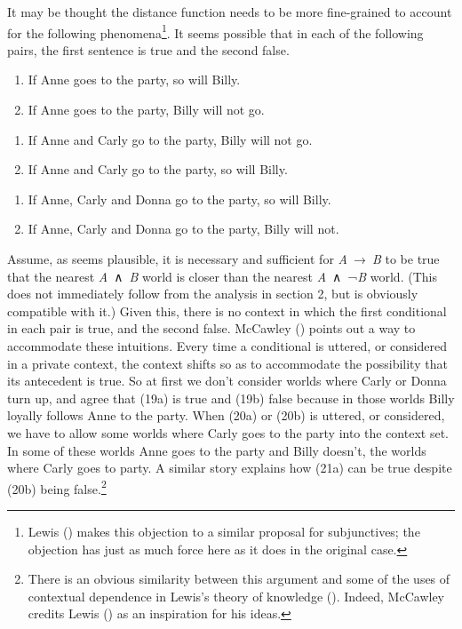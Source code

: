 \documentclass[
  11pt,
  letterpaper,
  DIV=11,
  numbers=noendperiod,
  twoside]{scrartcl}
\providecommand{\tightlist}{%
  \setlength{\itemsep}{0pt}\setlength{\parskip}{0pt}}
\begin{document}
It may be thought the distance function needs to be more fine-grained to
account for the following phenomena\footnote{Lewis
  () makes this objection to a similar
  proposal for subjunctives; the objection has just as much force here
  as it does in the original case.}. It seems possible that in each of
the following pairs, the first sentence is true and the second false.

\begin{description}
\tightlist
\item[(19)]
\hfill
\begin{enumerate}
\def\labelenumi{\alph{enumi}.}
\tightlist
\item
  If Anne goes to the party, so will Billy.
\item
  If Anne goes to the party, Billy will not go.
\end{enumerate}
\item[(20)]
\hfill
\begin{enumerate}
\def\labelenumi{\alph{enumi}.}
\tightlist
\item
  If Anne and Carly go to the party, Billy will not go.
\item
  If Anne and Carly go to the party, so will Billy.
\end{enumerate}
\item[(21)]
\hfill
\begin{enumerate}
\def\labelenumi{\alph{enumi}.}
\tightlist
\item
  If Anne, Carly and Donna go to the party, so will Billy.
\item
  If Anne, Carly and Donna go to the party, Billy will not.
\end{enumerate}
\end{description}

Assume, as seems plausible, it is necessary and sufficient for
\emph{A}~→~\emph{B} to be true that the nearest \emph{A}~∧~\emph{B}
world is closer than the nearest \emph{A}~∧~¬\emph{B} world. (This does
not immediately follow from the analysis in section 2, but is obviously
compatible with it.) Given this, there is no context in which the first
conditional in each pair is true, and the second false. McCawley
() points out a way to accommodate
these intuitions. Every time a conditional is uttered, or considered in
a private context, the context shifts so as to accommodate the
possibility that its antecedent is true. So at first we don't consider
worlds where Carly or Donna turn up, and agree that (19a) is true and
(19b) false because in those worlds Billy loyally follows Anne to the
party. When (20a) or (20b) is uttered, or considered, we have to allow
some worlds where Carly goes to the party into the context set. In some
of these worlds Anne goes to the party and Billy doesn't, the worlds
where Carly goes to party. A similar story explains how (21a) can be
true despite (20b) being false.\footnote{There is an obvious similarity
  between this argument and some of the uses of contextual dependence in
  Lewis's theory of knowledge ().
  Indeed, McCawley credits Lewis () as
  an inspiration for his ideas.}
\end{document}

